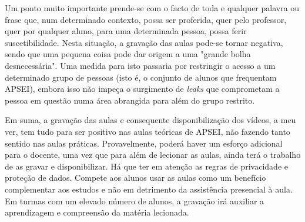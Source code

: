 \documentclass[portuguese, 11pt, a4paper, titlepage, oneside]{article}
\begin{document}
Um ponto muito importante prende-se com o facto de toda e qualquer palavra ou frase que, num determinado contexto, possa ser proferida, quer pelo professor, quer por qualquer aluno, para uma determinada pessoa, possa ferir suscetibilidade. Nesta situação, a gravação das aulas pode-se tornar negativa, sendo que uma pequena coisa pode dar origem a uma "grande bolha desnecessária". Uma medida para isto passaria por restringir o acesso a um determinado grupo de pessoas (isto é, o conjunto de alunos que frequentam APSEI), embora isso não impeça o surgimento de \textit{leaks} que comprometam a pessoa em questão numa área abrangida para além do grupo restrito.

Em suma, a gravação das aulas e consequente disponibilização dos vídeos, a meu ver, tem tudo para ser positivo nas aulas teóricas de APSEI, não fazendo tanto sentido nas aulas práticas. Provavelmente, poderá haver um esforço adicional para o docente, uma vez que para além de lecionar as aulas, ainda terá o trabalho de as gravar e disponibilizar. Há que ter em atenção as regras de privacidade e proteção de dados. Compete aos alunos usar as aulas como um benefício complementar aos estudos e não em detrimento da assistência presencial à aula. Em turmas com um elevado número de alunos, a gravação irá auxiliar a aprendizagem e compreensão da matéria lecionada.
\end{document}
